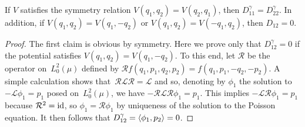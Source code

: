 \documentclass[11pt,a4paper]{article}
\begin{document}
\begin{lemma}
    \label{lemma:diffusion_symmmetry}
    If $V$ satisfies the symmetry relation $V(q_1, q_2) = V(q_2, q_1)$,
    then $D^{\gamma}_{11} = D^{\gamma}_{22}$.
    In addition, if $V(q_1, q_2) = V(q_1, -q_2)$ or $V(q_1, q_2) = V(-q_1, q_2)$,
    then $D_{12} = 0$.
\end{lemma}
\begin{proof}
    The first claim is obvious by symmetry.
    Here we prove only that $D^{\gamma}_{12} = 0$ if the potential satisfies $V(q_1, q_2) = V(q_1, -q_2)$.
    To this end,
    let $\mathcal R$ be the operator on~$L^2_0(\mu)$ defined by $\mathcal R f(q_1, p_1, q_2, p_2) = f(q_1, p_1, -q_2, -p_2)$.
    A simple calculation shows that~$\mathcal R \mathcal L \mathcal R = \mathcal L$ and so,
    denoting by $\phi_1$ the solution to $- \mathcal L \phi_1 = p_1$ posed on~$L^2_0(\mu)$,
    we have $- \mathcal R \mathcal L \mathcal R \phi_1 = p_1$.
    This implies  $- \mathcal L \mathcal R \phi_1 = p_1$ because $\mathcal R^2 = \operatorname{id}$,
    so $\phi_1 = \mathcal R \phi_1$ by uniqueness of the solution to the Poisson equation.
    It then follows that $D^{\gamma}_{12} = \ip{\phi_1}{p_2} = 0$.
\end{proof}
\end{document}

